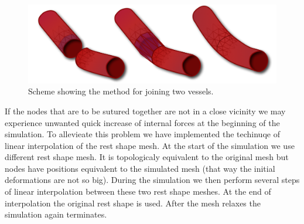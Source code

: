 \begin{figure}[tbh]
\begin{center}
\includegraphics[width=\columnwidth]{img/rest_shape_scheme.png}
\end{center}

\caption{Scheme showing the method for joining two vessels.}
\label{fig-JoiningVessels}
\end{figure}

If the nodes that are to be sutured together are not in a close vicinity we
may experience unwanted quick increase of internal forces at the beginning
of the simulation. To allevieate this problem we have implemented the
techinuqe of linear interpolation of the rest shape mesh. At the start of
the simulation we use different rest shape mesh. It is topologicaly
equivalent to the original mesh but nodes have positions equivalent to the
simulated mesh (that way the initial deformations are not so big). During
the simulation we then perform several steps of linear interpolation
between these two rest shape meshes. At the end of interpolation the
original rest shape is used. After the mesh relaxes the simulation again
terminates.

